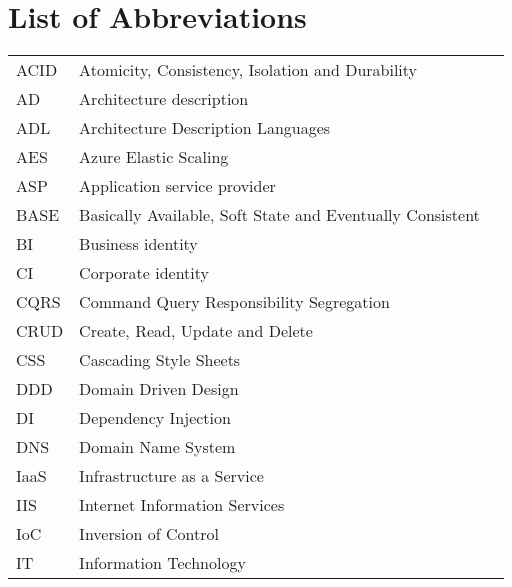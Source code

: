 \chapter{List of Abbreviations}



\begin{table}[h]
\centering
\begin{tabularx}{\textwidth}{l X l}
ACID        & Atomicity, Consistency, Isolation and Durability  &  \\
AD          & Architecture description &  \\
ADL         & Architecture Description Languages &  \\
AES         & Azure Elastic Scaling                  &  \\
ASP         & Application service provider &  \\
BASE        & Basically Available, Soft State and Eventually Consistent & \\
BI          & Business identity                                                                                     &  \\
CI          & Corporate identity                                                                                    &  \\
CQRS        & Command Query Responsibility Segregation   &  \\
CRUD        & Create, Read, Update and Delete           &  \\
CSS         & Cascading Style Sheets                                                                                &  \\
DDD         & Domain Driven Design                                                                                  &  \\
DI          & Dependency Injection                                                                                  &  \\
DNS         & Domain Name System                                                                                    &  \\
IaaS        & Infrastructure as a Service   &  \\
IIS         & Internet Information Services &  \\
IoC         & Inversion of Control                                                                                  &  \\
IT          & Information Technology                                                                                &  \\

\end{tabularx}
\end{table}
